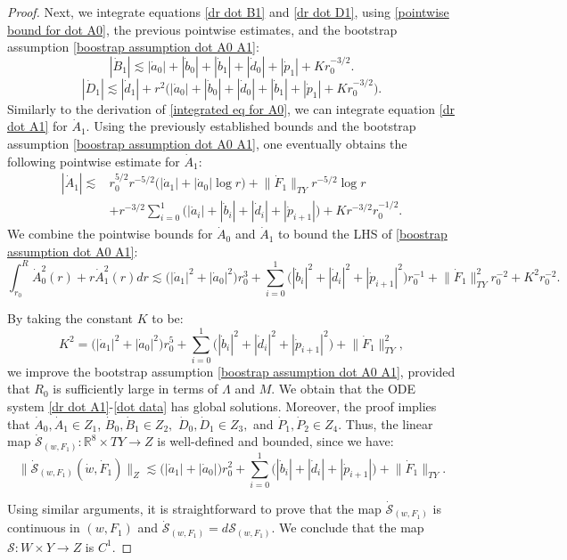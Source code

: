 \documentclass[11pt]{article}
\numberwithin{equation}{section}
\begin{document}
\begin{proof}
    Next, we integrate equations \eqref{dr dot B1} and \eqref{dr dot D1}, using \eqref{pointwise bound for dot A0}, the previous pointwise estimates, and the bootstrap assumption \eqref{boostrap assumption dot A0 A1}:
    \[|\dot{B}_1|\lesssim|\dot{a}_0|+|\dot{b}_0|+|\dot{b}_1|+|\dot{d}_0|+|\dot{p}_1|+Kr_0^{-3/2}.\]
    \[|\dot{D}_1|\lesssim|\dot{d}_1|+r^2\big(|\dot{a}_0|+|\dot{b}_0|+|\dot{d}_0|+|\dot{b}_1|+|\dot{p}_1|+Kr_0^{-3/2}\big).\]
    Similarly to the derivation of \eqref{integrated eq for A0}, we can integrate equation \eqref{dr dot A1} for $\dot{A}_1$. Using the previously established bounds and the bootstrap assumption \eqref{boostrap assumption dot A0 A1}, one eventually obtains the following pointwise estimate for $\dot{A}_1$:
    \begin{align*}
        |\dot{A}_1|\lesssim & r_0^{5/2}r^{-5/2}\big(|\dot{a}_1|+|\dot{a}_0|\log r\big)+\big\|\dot{F}_1\big\|_{TY}r^{-5/2}\log r\\ &+r^{-3/2}\sum_{i=0}^1\big(|\dot{a}_i|+|\dot{b}_i|+|\dot{d}_i|+|\dot{p}_{i+1}|\big)+Kr^{-3/2}r_0^{-1/2}.
    \end{align*}
    We combine the pointwise bounds for $\dot{A}_0$ and $\dot{A}_1$ to bound the LHS of \eqref{boostrap assumption dot A0 A1}:
    \[\int_{r_0}^R\dot{A}_0^2(r)+r\dot{A}_1^2(r)dr\lesssim\big(|\dot{a}_1|^2+|\dot{a}_0|^2\big)r_0^3+\sum_{i=0}^1\big(|\dot{b}_i|^2+|\dot{d}_i|^2+|\dot{p}_{i+1}|^2\big)r_0^{-1}+\big\|\dot{F}_1\big\|_{TY}^2r_0^{-2}+K^2r_0^{-2}.\]
    
    By taking the constant $K$ to be:
    \[K^2=\big(|\dot{a}_1|^2+|\dot{a}_0|^2\big)r_0^5+\sum_{i=0}^1\big(|\dot{b}_i|^2+|\dot{d}_i|^2+|\dot{p}_{i+1}|^2\big)+\big\|\dot{F}_1\big\|_{TY}^2,\]
    we improve the bootstrap assumption \eqref{boostrap assumption dot A0 A1}, provided that $R_0$ is sufficiently large in terms of $\Lambda$ and $M$. We obtain that the ODE system \eqref{dr dot A1}-\eqref{dot data} has global solutions. Moreover, the proof implies that $\dot{A}_0,\dot{A}_1\in Z_1$, $\dot{B}_0,\dot{B}_1\in Z_2,$ $\dot{D}_0,\dot{D}_1\in Z_3,$ and $\dot{P}_1,\dot{P}_2\in Z_4.$ Thus, the linear map $\dot{\mathcal{S}}_{(w,F_1)}:\mathbb{R}^8\times TY\rightarrow Z$ is well-defined and bounded, since we have:
    \[\big\|\dot{\mathcal{S}}_{(w,F_1)}(\dot{w},\dot{F}_1)\big\|_Z\lesssim\big(|\dot{a}_1|+|\dot{a}_0|\big)r_0^2+\sum_{i=0}^1\big(|\dot{b}_i|+|\dot{d}_i|+|\dot{p}_{i+1}|\big)+\big\|\dot{F}_1\big\|_{TY}.\]

    Using similar arguments, it is straightforward to prove that the map $\dot{\mathcal{S}}_{(w,F_1)}$ is continuous in $(w,F_1)$ and $\dot{\mathcal{S}}_{(w,F_1)}=d\mathcal{S}_{(w,F_1)}$. We conclude that the map $\mathcal{S}:W\times Y\rightarrow Z$ is $C^1.$
    
    \end{proof}
\end{document}
